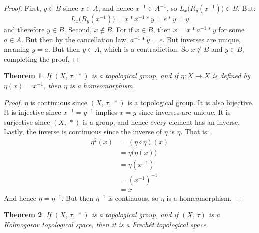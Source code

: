 \documentclass{article}
\theoremstyle{plain}
\newtheorem{theorem}{Theorem}[section]
\theoremstyle{normal}
\begin{document}
        \begin{proof}
            First, $y\in{B}$ since $x\in{A}$, and hence
            $x^{-1}\in{A}^{-1}$, so $L_{x}\big(R_{y}(x^{-1})\big)\in{B}$.
            But:
            \begin{equation}
                L_{x}\big(R_{y}(x^{-1})\big)=x*x^{-1}*y=e*y=y
            \end{equation}
            and therefore $y\in{B}$. Second, $x\notin{B}$. For if
            $x\in{B}$, then $x=x*a^{-1}*y$ for some $a\in{A}$. But then by the
            cancellation law, $a^{-1}*y=e$. But inverses are unique, meaning
            $y=a$. But then $y\in{A}$, which is a contradiction. So
            $x\notin{B}$ and $y\in{B}$, completing the proof.
        \end{proof}
        \begin{theorem}
            If $(X,\,\tau,\,*)$ is a topological group, and if
            $\eta:X\rightarrow{X}$ is defined by $\eta(x)=x^{-1}$, then
            $\eta$ is a homeomorphism.
        \end{theorem}
        \begin{proof}
            $\eta$ is continuous since $(X,\,\tau,\,*)$ is a topological
            group. It is also bijective. It is injective since
            $x^{-1}=y^{-1}$ implies $x=y$ since inverses are unique. It is
            surjective since $(X,\,*)$ is a group, and hence every element has
            an inverse. Lastly, the inverse is continuous since the inverse of
            $\eta$ is $\eta$. That is:
            \begin{align}
                \eta^{2}(x)
                &=(\eta\circ\eta)(x)\\
                &=\eta\big(\eta(x)\big)\\
                &=\eta(x^{-1})\\
                &=(x^{-1})^{-1}\\
                &=x
            \end{align}
            And hence $\eta=\eta^{-1}$. But then $\eta^{-1}$ is continuous,
            so $\eta$ is a homeomorphism.
        \end{proof}
        \begin{theorem}
            If $(X,\,\tau,\,*)$ is a topological group, and if
            $(X,\,\tau)$ is a Kolmogorov topological space, then it is a
            Frech\'{e}t topological space.
        \end{theorem}
\end{document}

